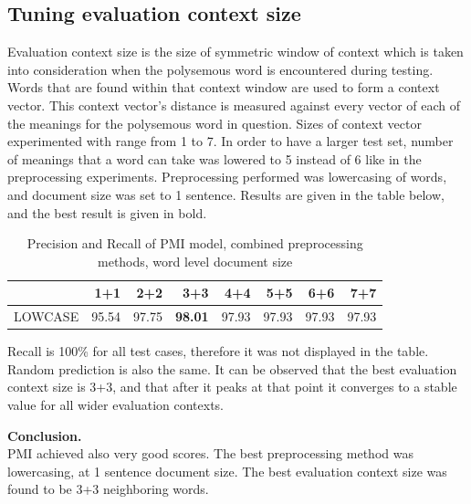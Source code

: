 \subsection{Tuning evaluation context size}
Evaluation context size is the size of symmetric window of context which is taken into consideration 
when the polysemous word is encountered during testing. Words that are found within that context
window are used to form a context vector. This context vector's distance is measured against every
vector of each  of the meanings for the polysemous word in question. Sizes of context vector 
experimented with range from 1 to 7. In order to have a larger test set, number of meanings that 
a word can take was lowered to 5 instead of 6 like in the preprocessing experiments. Preprocessing
performed was lowercasing of words, and document size was set to 1 sentence. 
Results are given 
in the table below, and the best result is given in bold. 

\begin{table}[h!]
\begin{tabular}{ l | r r r r r r r}
    &  1+1 & 2+2 & 3+3 & 4+4 & 5+5 & 6+6 & 7+7 \\
\hline
LOWCASE  & 95.54 & 97.75 & \textbf{98.01} & 97.93 & 97.93 & 97.93 & 97.93 \\
\end{tabular}
\caption{Precision and Recall of PMI model,  combined preprocessing methods, word level document size}
\end{table} 

Recall is 100\% for all test cases, therefore it was not displayed in the table. Random prediction is also the same. 
It can be observed that the best evaluation context size is 3+3, and that after it peaks at that point it converges to a stable value for all wider evaluation contexts. 

\textbf{Conclusion.}\\
PMI achieved also very good scores. The best preprocessing method was lowercasing, at 1 sentence document size. The best evaluation context size was found to be 3+3 neighboring words. 


